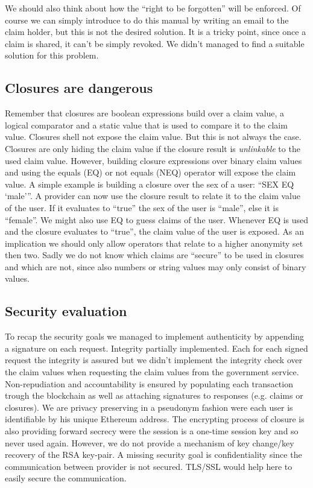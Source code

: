 We should also think about how the “right to be forgotten” will be enforced. Of course we can simply introduce to do this manual by writing an email to the claim holder, but this is not the desired solution. It is a tricky point, since once a claim is shared, it can’t be simply revoked. We didn’t managed to find a suitable solution for this problem.  

\subsection{Closures are dangerous}
Remember that closures are boolean expressions build over a claim value, a logical comparator and a static value that is used to compare it to the claim value. Closures shell not expose the claim value. But this is not always the case. Closures are only hiding the claim value if the closure result is \textit{unlinkable} to the used claim value. However, building closure expressions over binary claim values and using the equals (EQ) or not equals (NEQ) operator will expose the claim value. A simple example is building a closure over the sex of a user: “SEX EQ ‘male’”. A provider can now use the closure result to relate it to the claim value of the user. If it evaluates to “true” the sex of the user is “male”, else it is “female”. We might also use EQ to guess claims of the user. Whenever EQ is used and the closure evaluates to “true”, the claim value of the user is exposed. As an implication we should only allow operators that relate to a higher anonymity set then two. Sadly we do not know which claims are “secure” to be used in closures and which are not, since also numbers or string values may only consist of binary values. 

\subsection{Security evaluation}
\label{sec:securityEvaluation}
To recap the security goals we managed to implement authenticity by appending a signature on each request. Integrity partially implemented. Each for each signed request the integrity is assured but we didn’t implement the integrity check over the claim values when requesting the claim values from the government service. Non-repudiation and accountability is ensured by populating each transaction trough the blockchain as well as attaching signatures to responses (e.g. claims or closures). We are privacy preserving in a pseudonym fashion were each user is identifiable by his unique Ethereum address. The encrypting process of closure is also providing forward secrecy were the session is a one-time session key and so never used again. However, we do not provide a mechanism of key change/key recovery of the RSA key-pair. A missing security goal is confidentiality since the communication between provider is not secured. TLS/SSL would help here to easily secure the communication.


